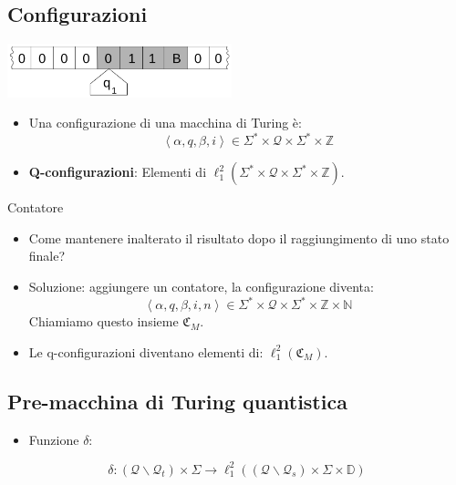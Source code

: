 \documentclass{beamer}
\begin{document}
\subsection{Configurazioni}

\begin{frame}{\subsecname}{}
	\centering\includegraphics[width=6.5cm]{Turing_machine_2b.svg.png}
	\begin{itemize}
		\item Una configurazione di una macchina di Turing è:
		\[ \left \langle \alpha, q, \beta, i \right \rangle \in \Sigma^{*} \times \mathcal{Q} \times \Sigma^{*} \times \mathbb{Z} \]
		\item \textbf{Q-configurazioni}: Elementi di \( \ell^{2}_{1} \left ( \Sigma^{*} \times \mathcal{Q} \times \Sigma^{*} \times \mathbb{Z} \right ) \).
	\end{itemize}
\end{frame}

\begin{frame}{\subsecname}{Contatore}
	\begin{itemize}
		\item Come mantenere inalterato il risultato dopo il raggiungimento di uno stato finale?
		\item Soluzione: aggiungere un contatore, la configurazione diventa:
		\[ \left \langle \alpha, q, \beta, i, n \right \rangle \in \Sigma^{*} \times \mathcal{Q} \times \Sigma^{*} \times \mathbb{Z} \times \mathbb{N} \]
		Chiamiamo questo insieme \(\mathfrak{C}_M\).
		\item Le q-configurazioni diventano elementi di: \( \ell^{2}_{1} \left ( \mathfrak{C}_M \right ) \).
	\end{itemize}
\end{frame}

\subsection{Pre-macchina di Turing quantistica}

\begin{frame}{\subsecname}{}
	\begin{itemize}
		\item Funzione \(\delta\):
	\end{itemize}
		\[ \delta : \left ( \mathcal{Q} \backslash \mathcal{Q}_{t} \right ) \times \Sigma \rightarrow \ell^{2}_{1} \left ( \left ( \mathcal{Q} \backslash \mathcal{Q}_{s} \right ) \times \Sigma \times \mathbb{D} \right ) \]
\end{frame}
\end{document}
